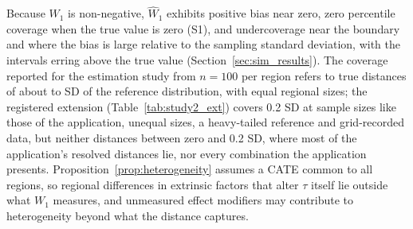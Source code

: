 \documentclass[AMA,Times1COL]{WileyNJDv5}
\begin{document}
Because $W_1$ is non-negative, $\widehat{W}_1$ exhibits positive bias near zero, zero percentile coverage when the true value is zero (S1), and undercoverage near the boundary and where the bias is large relative to the sampling standard deviation, with the intervals erring above the true value (Section~\ref{sec:sim_results}). The coverage reported for the estimation study from $n = 100$ per region refers to true distances of about  to  SD of the reference distribution, with equal regional sizes; the registered extension (Table~\ref{tab:study2_ext}) covers 0.2 SD at sample sizes like those of the application, unequal sizes, a heavy-tailed reference and grid-recorded data, but neither distances between zero and 0.2 SD, where most of the application's resolved distances lie, nor every combination the application presents. Proposition~\ref{prop:heterogeneity} assumes a CATE common to all regions, so regional differences in extrinsic factors that alter $\tau$ itself lie outside what $W_1$ measures, and unmeasured effect modifiers may contribute to heterogeneity beyond what the distance captures.
\end{document}
